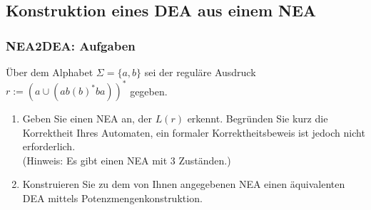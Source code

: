 \documentclass{beamer}
\begin{document}
{\subsection{Konstruktion eines DEA aus einem NEA}
\begin{frame}
  \frametitle{NEA2DEA: Aufgaben}
  Über dem Alphabet $\Sigma = \{a,b\}$ sei der reguläre
  Ausdruck
  $r := {(a \cup (ab (b)^* ba))^*}$
  gegeben.
  \begin{enumerate}
    \setlength{\itemsep}{0ex}
  \item Geben Sie einen NEA an, der $L(r)$ erkennt. Begründen Sie
    kurz die Korrektheit Ihres Automaten, ein formaler
    Korrektheitsbeweis ist jedoch nicht erforderlich.\\
    (Hinweis: Es gibt einen NEA mit 3 Zuständen.)
  \item Konstruieren Sie zu dem von Ihnen angegebenen NEA einen
    äquivalenten DEA mittels Potenzmengenkonstruktion.
  \end{enumerate}
\end{frame}


}
\end{document}
